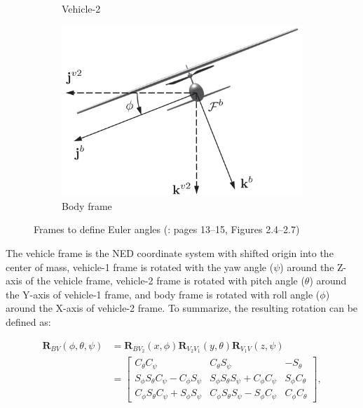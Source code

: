 \begin{figure}[!ht]
\begin{subfigure}{0.38\textwidth}
         \caption{Vehicle-2}\label{fig:vehicle-2}
    \end{subfigure}
    \begin{subfigure}{0.38\textwidth}
        \centering
         \includegraphics[width=\textwidth]{figures/body.png}
         \caption{Body frame}\label{fig:body}
    \end{subfigure}\label{fig:frames}
    \caption{Frames to define Euler angles (\cite{EKF-UAS-2}: pages 13--15, Figures 2.4--2.7)}
\end{figure}

The vehicle frame is the NED coordinate system with shifted origin into the center of mass, vehicle-1 frame is rotated with the yaw angle ($\psi$)  around the Z-axis of the vehicle frame, vehicle-2 frame is rotated with pitch angle ($\theta$) around the Y-axis of vehicle-1 frame, and body frame is rotated with roll angle ($\phi$) around the X-axis of vehicle-2 frame. To summarize, the resulting rotation can be defined as:

\begin{equation}
\begin{aligned}
    \mathbf{R}_{BV}(\phi,\theta,\psi)&=\mathbf{R}_{BV_2}(x,\phi)\mathbf{R}_{V_2V_1}(y,\theta)\mathbf{R}_{V_1V}(z,\psi) \\
    &=
    \begin{bmatrix}
        C_\theta C_\psi & C_\theta S_\psi & -S_\theta \\
        S_\phi S_\theta C_\psi - C_\phi S_\psi & S_\phi S_\theta S_\psi + C_\phi C_\psi & S_\phi C_\theta \\
        C_\phi S_\theta C_\psi + S_\phi S_\psi & C_\phi S_\theta S_\psi - S_\phi C_\psi & C_\phi C_\theta
    \end{bmatrix}, 
\end{aligned}
\label{eq:euler-angles}
\end{equation}

